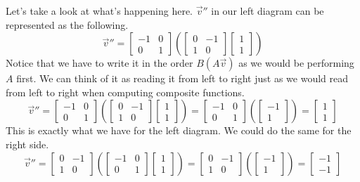 \documentclass[../../main.tex]{subfiles}
\begin{document}
Let's take a look at what's happening here. $\vec{v}''$ in our
left diagram can be represented as the following.
\[
\vec{v}'' =
\begin{bmatrix}
    -1 & 0 \\
    0  & 1
\end{bmatrix}
\left(
\begin{bmatrix}
    0 & -1 \\
    1 & 0
\end{bmatrix}
\begin{bmatrix}
    1 \\
    1
\end{bmatrix}
\right)
\]
Notice that we have to write it in the order $B(A\vec{v})$ as we
would be performing $A$ first. We can think of it as reading it from
left to right just as we would read from left to right when
computing composite functions.
\[
\vec{v}'' =
\begin{bmatrix}
    -1 & 0 \\
    0  & 1
\end{bmatrix}
\left(
\begin{bmatrix}
    0 & -1 \\
    1 & 0
\end{bmatrix}
\begin{bmatrix}
    1 \\
    1
\end{bmatrix}
\right)
=
\begin{bmatrix}
    -1 & 0 \\
    0  & 1
\end{bmatrix}
\left(
\begin{bmatrix}
    -1 \\
    1
\end{bmatrix}
\right)
=
\begin{bmatrix}
    1 \\
    1
\end{bmatrix}
\]
This is exactly what we have for the left diagram. We could do
the same for the right side.
\[
\vec{v}'' =
\begin{bmatrix}
    0 & -1 \\
    1 & 0
\end{bmatrix}
\left(
\begin{bmatrix}
    -1 & 0 \\
    0  & 1
\end{bmatrix}
\begin{bmatrix}
    1 \\
    1
\end{bmatrix}
\right)
=
\begin{bmatrix}
    0 & -1 \\
    1 & 0
\end{bmatrix}
\left(
\begin{bmatrix}
    -1 \\
    1
\end{bmatrix}
\right)
=
\begin{bmatrix}
    -1 \\
    -1
\end{bmatrix}
\]
\end{document}
